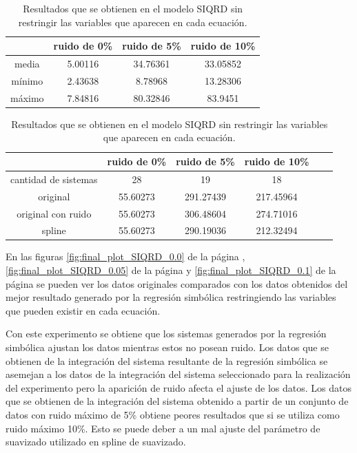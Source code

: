 \begin{table}[!h]
    \centering
    \caption{Resultados que se obtienen en el modelo SIQRD sin restringir las variables que aparecen en cada ecuación.}
    \begin{tabular}{|c|c|c|c|}
        \hline
               & \textbf{ruido de 0\%} & \textbf{ruido de 5\%} & \textbf{ruido de 10\%} \\
        \hline
        media  & 5.00116               & 34.76361              & 33.05852               \\
        \hline
        mínimo & 2.43638               & 8.78968               & 13.28306               \\
        \hline
        máximo & 7.84816               & 80.32846              & 83.9451                \\
        \hline
    \end{tabular}

    \begin{tabular}{|c|c|c|c|c|c|}
        \hline
                             & \textbf{ruido de 0\%} & \textbf{ruido de 5\%} & \textbf{ruido de 10\%} \\
        \hline
        cantidad de sistemas & 28                    & 19                    & 18                     \\
        \hline
        original             & 55.60273              & 291.27439             & 217.45964              \\
        \hline
        original con ruido   & 55.60273              & 306.48604             & 274.71016              \\
        \hline
        spline               & 55.60273              & 290.19036             & 212.32494              \\
        \hline
    \end{tabular}
    \label{table:experiment_SIQRD_all}
\end{table}

En las figuras \ref{fig:final_plot_SIQRD_0.0} de la página \pageref{fig:final_plot_SIQRD_0.0}, \ref{fig:final_plot_SIQRD_0.05} de la página \pageref{fig:final_plot_SIQRD_0.05} y \ref{fig:final_plot_SIQRD_0.1} de la página \pageref{fig:final_plot_SIQRD_0.1} se pueden ver los datos originales comparados con los datos obtenidos del mejor resultado generado por la regresión simbólica restringiendo las variables que pueden existir en cada ecuación.

Con este experimento se obtiene que los sistemas generados por la regresión simbólica ajustan los datos mientras estos no posean ruido. Los datos que se obtienen de la integración del sistema resultante de la regresión simbólica se asemejan a los datos de la integración del sistema seleccionado para la realización del experimento pero la aparición de ruido afecta el ajuste de los datos. Los datos que se obtienen de la integración del sistema obtenido a partir de un conjunto de datos con ruido máximo de 5\% obtiene peores resultados que si se utiliza como ruido máximo 10\%. Esto se puede deber a un mal ajuste del parámetro de suavizado utilizado en spline de suavizado.


